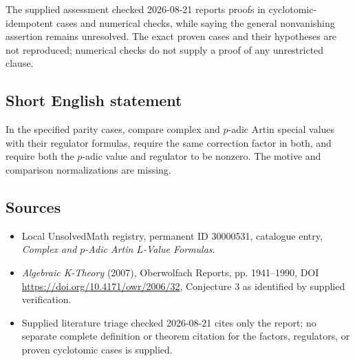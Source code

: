 \documentclass[11pt]{article}
\begin{document}
The supplied assessment checked 2026-08-21 reports proofs in cyclotomic-idempotent cases and numerical checks, while saying the general nonvanishing assertion remains unresolved. The exact proven cases and their hypotheses are not reproduced; numerical checks do not supply a proof of any unrestricted clause.
\subsection{Short English statement}
In the specified parity cases, compare complex and \(p\)-adic Artin special values with their regulator formulas, require the same correction factor in both, and require both the \(p\)-adic value and regulator to be nonzero. The motive and comparison normalizations are missing.
\subsection{Sources}
\begin{itemize}
\item Local UnsolvedMath registry, permanent ID 30000531, catalogue entry, \emph{Complex and \(p\)-Adic Artin \(L\)-Value Formulas}.
\item \emph{Algebraic K-Theory} (2007), Oberwolfach Reports, pp. 1941--1990, DOI \url{https://doi.org/10.4171/owr/2006/32}, Conjecture 3 as identified by supplied verification.
\item Supplied literature triage checked 2026-08-21 cites only the report; no separate complete definition or theorem citation for the factors, regulators, or proven cyclotomic cases is supplied.
\end{itemize}
\end{document}
